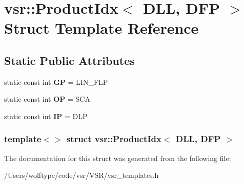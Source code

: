 \hypertarget{structvsr_1_1_product_idx_3_01_d_l_l_00_01_d_f_p_01_4}{\section{vsr\-:\-:Product\-Idx$<$ D\-L\-L, D\-F\-P $>$ Struct Template Reference}
\label{structvsr_1_1_product_idx_3_01_d_l_l_00_01_d_f_p_01_4}
}
\subsection*{Static Public Attributes}
\begin{DoxyCompactItemize}
\item 
\hypertarget{structvsr_1_1_product_idx_3_01_d_l_l_00_01_d_f_p_01_4_a7ffbd1b9955cb359894f06cd045d5a5c}{static const int {\bfseries G\-P} = L\-I\-N\-\_\-\-F\-L\-P}\label{structvsr_1_1_product_idx_3_01_d_l_l_00_01_d_f_p_01_4_a7ffbd1b9955cb359894f06cd045d5a5c}

\item 
\hypertarget{structvsr_1_1_product_idx_3_01_d_l_l_00_01_d_f_p_01_4_acd2a8856bf47f45825acaeb3dd2a7831}{static const int {\bfseries O\-P} = S\-C\-A}\label{structvsr_1_1_product_idx_3_01_d_l_l_00_01_d_f_p_01_4_acd2a8856bf47f45825acaeb3dd2a7831}

\item 
\hypertarget{structvsr_1_1_product_idx_3_01_d_l_l_00_01_d_f_p_01_4_a16a16892cf5c5be07e1c51df885fab30}{static const int {\bfseries I\-P} = D\-L\-P}\label{structvsr_1_1_product_idx_3_01_d_l_l_00_01_d_f_p_01_4_a16a16892cf5c5be07e1c51df885fab30}

\end{DoxyCompactItemize}
\subsubsection*{template$<$$>$ struct vsr\-::\-Product\-Idx$<$ D\-L\-L, D\-F\-P $>$}



The documentation for this struct was generated from the following file\-:\begin{DoxyCompactItemize}
\item 
/\-Users/wolftype/code/vsr/\-V\-S\-R/vsr\-\_\-templates.\-h\end{DoxyCompactItemize}

